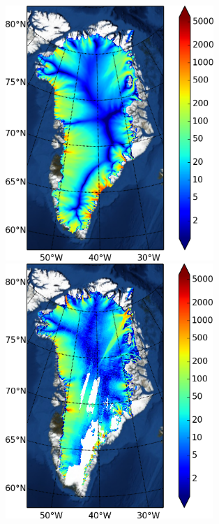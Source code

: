 \documentclass[gmd]{copernicus}   %
\begin{document}
\newcommand{\grnht}{3.8in}

\begin{figure}[ht]
\mbox{\includegraphics[height=\grnht,keepaspectratio=true]{g2km-init-velsurf-mag} \,
\includegraphics[height=\grnht,keepaspectratio=true]{Greenland-surfvelmag}}

\end{figure}
\end{document}

